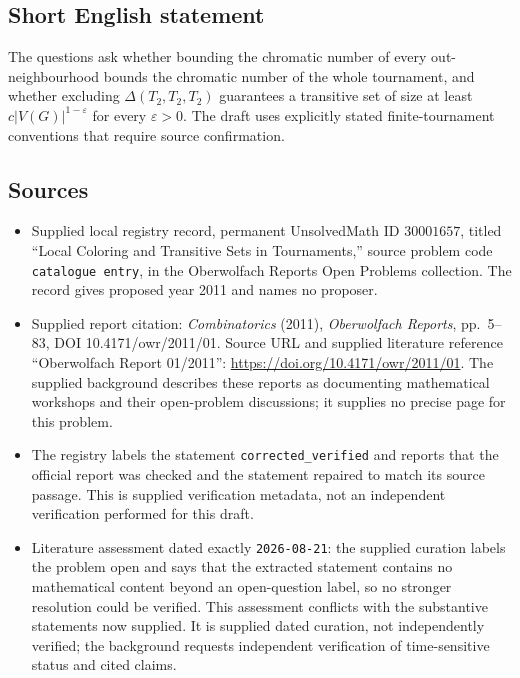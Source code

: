 \documentclass[11pt]{article}
\begin{document}
\subsection{Short English statement}
The questions ask whether bounding the chromatic number of every out-neighbourhood bounds the chromatic number of the whole tournament, and whether excluding \(\Delta(T_2,T_2,T_2)\) guarantees a transitive set of size at least \(c|V(G)|^{1-\varepsilon}\) for every \(\varepsilon>0\). The draft uses explicitly stated finite-tournament conventions that require source confirmation.
\subsection{Sources}
\begin{itemize}
\item Supplied local registry record, permanent UnsolvedMath ID \(30001657\), titled ``Local Coloring and Transitive Sets in Tournaments,'' source problem code \texttt{catalogue entry}, in the Oberwolfach Reports Open Problems collection. The record gives proposed year 2011 and names no proposer.
\item Supplied report citation: \emph{Combinatorics} (2011), \emph{Oberwolfach Reports}, pp.\ 5--83, DOI 10.4171/owr/2011/01. Source URL and supplied literature reference ``Oberwolfach Report 01/2011'': \url{https://doi.org/10.4171/owr/2011/01}. The supplied background describes these reports as documenting mathematical workshops and their open-problem discussions; it supplies no precise page for this problem.
\item The registry labels the statement \texttt{corrected\_verified} and reports that the official report was checked and the statement repaired to match its source passage. This is supplied verification metadata, not an independent verification performed for this draft.
\item Literature assessment dated exactly \texttt{2026-08-21}: the supplied curation labels the problem open and says that the extracted statement contains no mathematical content beyond an open-question label, so no stronger resolution could be verified. This assessment conflicts with the substantive statements now supplied. It is supplied dated curation, not independently verified; the background requests independent verification of time-sensitive status and cited claims.
\end{itemize}
\end{document}
